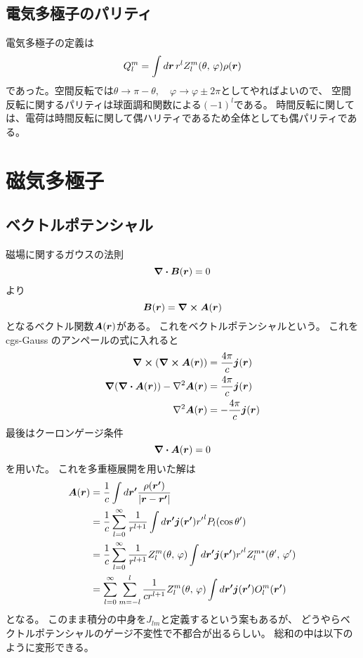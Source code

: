 \documentclass[../../master.tex]{subfiles}
\begin{document}
\subsection{電気多極子のパリティ}
電気多極子の定義は
\begin{equation}
    Q_l^m = \int d\vb*{r}\, r^l Z_l^m(\theta,\,\varphi)\rho(\vb*{r})
\end{equation}
であった。空間反転では\(\theta\rightarrow\pi-\theta,\quad\varphi\rightarrow\varphi\pm 2\pi\)としてやればよいので、
空間反転に関するパリティは球面調和関数による\((-1)^l\)である。
時間反転に関しては、電荷は時間反転に関して偶ハリティであるため全体としても偶パリティである。

\section{磁気多極子}
\subsection{ベクトルポテンシャル}
磁場に関するガウスの法則
\begin{equation}
    \div \vb*{B}(\vb*{r}) = 0
\end{equation}
より
\begin{equation}
    \vb*{B}(\vb*{r}) = \curl \vb*{A}(\vb*{r})
\end{equation}
となるベクトル関数\(\vb*{A}(\vb*{r})\)がある。
これをベクトルポテンシャルという。
これを cgs-Gauss のアンペールの式に入れると
\begin{align}
    \curl (\curl \vb*{A}(\vb*{r})) &= \frac{4\pi}{c} \vb*{j}(\vb*{r})\\
    \grad(\div\vb*{A}(\vb*{r})) - \laplacian \vb*{A}(\vb*{r}) &= \frac{4\pi}{c}\vb*{j}(\vb*{r})\\
    \laplacian \vb*{A}(\vb*{r}) &= -\frac{4\pi}{c}\vb*{j}(\vb*{r})
\end{align}
最後はクーロンゲージ条件
\begin{equation}
    \div \vb*{A}(\vb*{r})=0
\end{equation}
を用いた。
これを多重極展開を用いた解は
\begin{align}
    \vb*{A}(\vb*{r})
    &= \frac{1}{c}\int d\vb*{r'} \frac{\rho(\vb*{r'})}{\abs{\vb*{r}-\vb*{r'}}}\\
    &= \frac{1}{c}\sum_{l=0}^{\infty} \frac{1}{r^{l+1}}\int d\vb*{r'} \vb*{j}(\vb*{r'}){r'}^l P_l(\cos\theta')\\
    &= \frac{1}{c}\sum_{l=0}^{\infty} \frac{1}{r^{l+1}} Z_l^m(\theta,\,\varphi)\int d\vb*{r'} \vb*{j}(\vb*{r'}){r'}^l Z_l^{m*}(\theta',\,\varphi')\\
    &= \sum_{l=0}^{\infty} \sum_{m=-l}^{l} \frac{1}{cr^{l+1}}Z_l^m(\theta,\,\varphi) \int d\vb*{r'} \vb*{j}(\vb*{r'}) O_l^{m}(\vb*{r'})
\end{align}
となる。
このまま積分の中身を\(J_{lm}\)と定義するという案もあるが、
どうやらベクトルポテンシャルのゲージ不変性で不都合が出るらしい\cite{Stefan2016}。
総和の中は以下のように変形できる。
\end{document}
